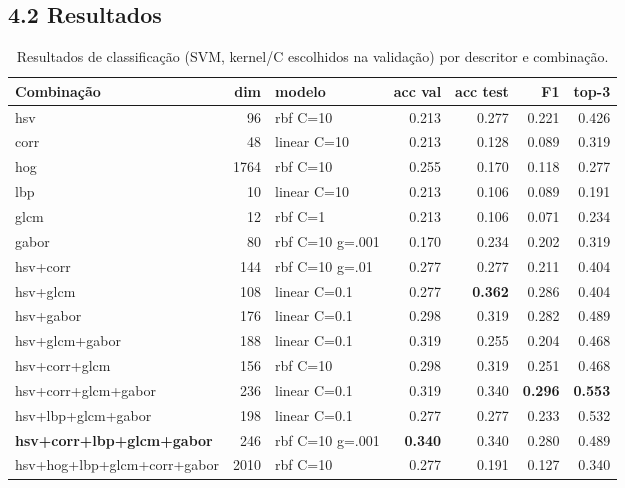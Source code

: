 \documentclass[12pt, a4paper]{article}
\begin{document}
\subsection*{4.2 Resultados}
\begin{table}[H]
\centering
\begin{tabularx}{\textwidth}{X r l r r r r}
\toprule
\textbf{Combinação} & \textbf{dim} & \textbf{modelo} & \textbf{acc val} & \textbf{acc test} & \textbf{F1} & \textbf{top-3} \\
\midrule
hsv                          & 96   & rbf C=10        & 0.213          & 0.277          & 0.221          & 0.426          \\
corr                         & 48   & linear C=10     & 0.213          & 0.128          & 0.089          & 0.319          \\
hog                          & 1764 & rbf C=10        & 0.255          & 0.170          & 0.118          & 0.277          \\
lbp                          & 10   & linear C=10     & 0.213          & 0.106          & 0.089          & 0.191          \\
glcm                         & 12   & rbf C=1         & 0.213          & 0.106          & 0.071          & 0.234          \\
gabor                        & 80   & rbf C=10 g=.001 & 0.170          & 0.234          & 0.202          & 0.319          \\
hsv+corr                     & 144  & rbf C=10 g=.01  & 0.277          & 0.277          & 0.211          & 0.404          \\
hsv+glcm                     & 108  & linear C=0.1    & 0.277          & \textbf{0.362} & 0.286          & 0.404          \\
hsv+gabor                    & 176  & linear C=0.1    & 0.298          & 0.319          & 0.282          & 0.489          \\
hsv+glcm+gabor               & 188  & linear C=0.1    & 0.319          & 0.255          & 0.204          & 0.468          \\
hsv+corr+glcm                & 156  & rbf C=10        & 0.298          & 0.319          & 0.251          & 0.468          \\
hsv+corr+glcm+gabor          & 236  & linear C=0.1    & 0.319          & 0.340          & \textbf{0.296} & \textbf{0.553} \\
hsv+lbp+glcm+gabor           & 198  & linear C=0.1    & 0.277          & 0.277          & 0.233          & 0.532          \\
\textbf{hsv+corr+lbp+glcm+gabor} & 246 & rbf C=10 g=.001 & \textbf{0.340} & 0.340       & 0.280          & 0.489          \\
hsv+hog+lbp+glcm+corr+gabor  & 2010 & rbf C=10        & 0.277          & 0.191          & 0.127          & 0.340          \\
\bottomrule
\end{tabularx}
\caption{Resultados de classificação (SVM, kernel/C escolhidos na validação) por descritor e combinação.}
\end{table}
\end{document}
